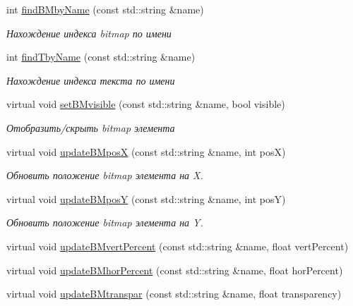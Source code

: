\begin{DoxyCompactItemize}
int \hyperlink{class_interface_element_class_aa878a2296a5fe72fb7a92e833f276961}{find\+B\+Mby\+Name} (const std\+::string \&name)
\begin{DoxyCompactList}\small\item\em Нахождение индекса bitmap по имени \end{DoxyCompactList}\item 
int \hyperlink{class_interface_element_class_a2d7805e3c6f80068b76618e3ad43f31f}{find\+Tby\+Name} (const std\+::string \&name)
\begin{DoxyCompactList}\small\item\em Нахождение индекса текста по имени \end{DoxyCompactList}\item 
virtual void \hyperlink{class_interface_element_class_a2148ae1a7b93246c9e89724340347de0}{set\+B\+Mvisible} (const std\+::string \&name, bool visible)
\begin{DoxyCompactList}\small\item\em Отобразить/скрыть bitmap элемента \end{DoxyCompactList}\item 
virtual void \hyperlink{class_interface_element_class_aefde245f4498eaed30056ba83515b3e7}{update\+B\+MposX} (const std\+::string \&name, int posX)
\begin{DoxyCompactList}\small\item\em Обновить положение bitmap элемента на X. \end{DoxyCompactList}\item 
virtual void \hyperlink{class_interface_element_class_aef92fb02c9e353893485939eaff5f8ee}{update\+B\+MposY} (const std\+::string \&name, int posY)
\begin{DoxyCompactList}\small\item\em Обновить положение bitmap элемента на Y. \end{DoxyCompactList}\item 
virtual void \hyperlink{class_interface_element_class_aaf28d020efdb4ff5ad334e6577198e59}{update\+B\+Mvert\+Percent} (const std\+::string \&name, float vert\+Percent)
\item 
virtual void \hyperlink{class_interface_element_class_a4891a40d50c2cdad0227bf4d45651f25}{update\+B\+Mhor\+Percent} (const std\+::string \&name, float hor\+Percent)
\item 
virtual void \hyperlink{class_interface_element_class_adecf79076fdb4192adab5f74239b6b62}{update\+B\+Mtranspar} (const std\+::string \&name, float transparency)
\item 

\end{DoxyCompactItemize}
